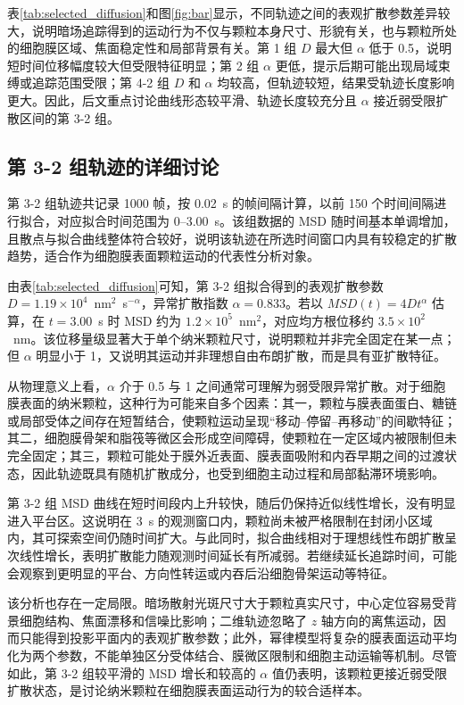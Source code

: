 \documentclass[a4paper]{article}
\begin{document}
表\ref{tab:selected_diffusion}和图\ref{fig:bar}显示，不同轨迹之间的表观扩散参数差异较大，说明暗场追踪得到的运动行为不仅与颗粒本身尺寸、形貌有关，也与颗粒所处的细胞膜区域、焦面稳定性和局部背景有关。第 1 组 $D$ 最大但 $\alpha$ 低于 0.5，说明短时间位移幅度较大但受限特征明显；第 2 组 $\alpha$ 更低，提示后期可能出现局域束缚或追踪范围受限；第 4-2 组 $D$ 和 $\alpha$ 均较高，但轨迹较短，结果受轨迹长度影响更大。因此，后文重点讨论曲线形态较平滑、轨迹长度较充分且 $\alpha$ 接近弱受限扩散区间的第 3-2 组。

\subsection{第 3-2 组轨迹的详细讨论}

第 3-2 组轨迹共记录 1000 帧，按 0.02~s 的帧间隔计算，以前 150 个时间间隔进行拟合，对应拟合时间范围为 0--3.00~s。该组数据的 MSD 随时间基本单调增加，且散点与拟合曲线整体符合较好，说明该轨迹在所选时间窗口内具有较稳定的扩散趋势，适合作为细胞膜表面颗粒运动的代表性分析对象。

由表\ref{tab:selected_diffusion}可知，第 3-2 组拟合得到的表观扩散参数 $D=1.19\times10^{4}$~nm$^2$~s$^{-\alpha}$，异常扩散指数 $\alpha=0.833$。若以 $MSD(t)=4Dt^{\alpha}$ 估算，在 $t=3.00$~s 时 MSD 约为 $1.2\times10^{5}$~nm$^2$，对应均方根位移约 $3.5\times10^{2}$~nm。该位移量级显著大于单个纳米颗粒尺寸，说明颗粒并非完全固定在某一点；但 $\alpha$ 明显小于 1，又说明其运动并非理想自由布朗扩散，而是具有亚扩散特征。

从物理意义上看，$\alpha$ 介于 0.5 与 1 之间通常可理解为弱受限异常扩散。对于细胞膜表面的纳米颗粒，这种行为可能来自多个因素：其一，颗粒与膜表面蛋白、糖链或局部受体之间存在短暂结合，使颗粒运动呈现“移动--停留--再移动”的间歇特征；其二，细胞膜骨架和脂筏等微区会形成空间障碍，使颗粒在一定区域内被限制但未完全固定；其三，颗粒可能处于膜外近表面、膜表面吸附和内吞早期之间的过渡状态，因此轨迹既具有随机扩散成分，也受到细胞主动过程和局部黏滞环境影响。

第 3-2 组 MSD 曲线在短时间段内上升较快，随后仍保持近似线性增长，没有明显进入平台区。这说明在 3~s 的观测窗口内，颗粒尚未被严格限制在封闭小区域内，其可探索空间仍随时间扩大。与此同时，拟合曲线相对于理想线性布朗扩散呈次线性增长，表明扩散能力随观测时间延长有所减弱。若继续延长追踪时间，可能会观察到更明显的平台、方向性转运或内吞后沿细胞骨架运动等特征。

该分析也存在一定局限。暗场散射光斑尺寸大于颗粒真实尺寸，中心定位容易受背景细胞结构、焦面漂移和信噪比影响；二维轨迹忽略了 $z$ 轴方向的离焦运动，因而只能得到投影平面内的表观扩散参数；此外，幂律模型将复杂的膜表面运动平均化为两个参数，不能单独区分受体结合、膜微区限制和细胞主动运输等机制。尽管如此，第 3-2 组较平滑的 MSD 增长和较高的 $\alpha$ 值仍表明，该颗粒更接近弱受限扩散状态，是讨论纳米颗粒在细胞膜表面运动行为的较合适样本。
\end{document}
